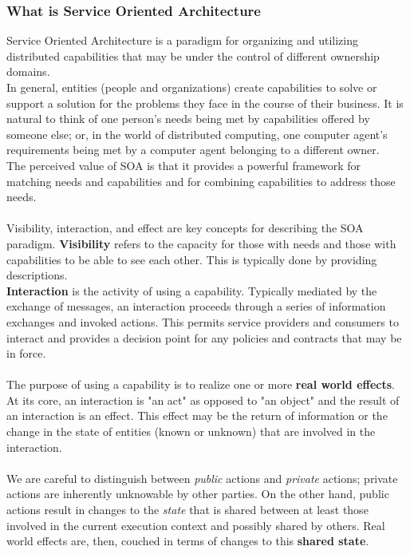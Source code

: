 \documentclass[10pt,a4paper]{article}
\begin{document}
\subsubsection{What is Service Oriented Architecture}
Service Oriented Architecture is a paradigm for organizing and utilizing distributed capabilities that may be under the control of different ownership domains. \\
In general, entities (people and organizations) create capabilities to solve or support a solution for the problems they face in the course of their business. It is natural to think of one person’s needs being met by capabilities offered by someone else; or, in the world of distributed computing, one computer agent’s requirements being met by a computer agent belonging to a different owner. \\ The perceived value of SOA is that it provides a powerful framework for matching needs and capabilities and for combining capabilities to address those needs. \\ \\
Visibility, interaction, and effect are key concepts for describing the SOA paradigm. \textbf{Visibility} refers to the capacity for those with needs and those with capabilities to be able to see each other. This is typically done by providing descriptions.\\ \textbf{Interaction} is the activity of using a capability. Typically mediated by the exchange of messages, an interaction proceeds through a series of information exchanges and invoked actions. This permits service providers and consumers to interact and provides a decision point for any policies and contracts that may be in force. \\ \\
The purpose of using a capability is to realize one or more \textbf{real world effects}. At its core, an interaction is "an act" as opposed to "an object" and the result of an interaction is an effect. This effect may be the return of information or the change in the state of entities (known or unknown) that are involved in the interaction. \\ \\ We are careful to distinguish between \textit{public} actions and \textit{private} actions; private actions are inherently unknowable by other parties. On the other hand, public actions result in changes to the \textit{state} that is shared between at least those involved in the current execution context and possibly shared by others. Real world effects are, then, couched in terms of changes to this \textbf{shared state}. \\ \\
\end{document}

